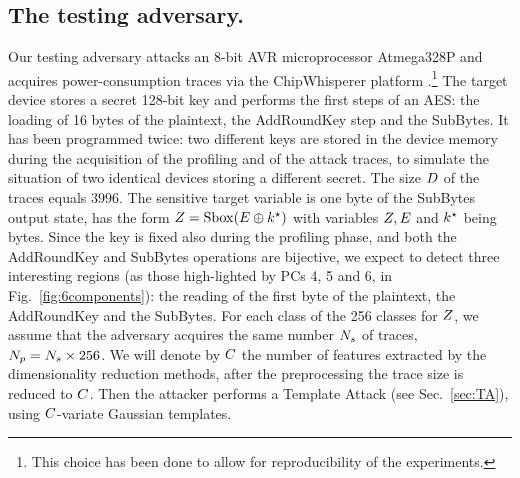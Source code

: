 \subsection{The testing adversary.}  
Our testing adversary attacks an 8-bit AVR microprocessor Atmega328P and acquires power-consumption traces via the ChipWhisperer platform \cite{o2014chipwhisperer}.\footnote{This choice has been done to allow for reproducibility of the experiments.} The target device stores a secret 128-bit key and performs the first steps of an AES: the loading of 16 bytes of the plaintext, the AddRoundKey step and the SubBytes. It has been programmed twice: two different keys are stored in the device memory during the acquisition of the profiling and of the attack traces, to simulate the situation of two identical devices storing a different secret. The size $D$ of the traces equals $3996$. The sensitive target  variable is one byte of the SubBytes output state, \ie has the form $Z = \mathrm{Sbox}(E \oplus k^\star)$ with variables $Z, E$ and $k^\star$ being bytes. Since the key is fixed also during the profiling phase, and both the AddRoundKey and SubBytes operations are bijective, we expect to detect three interesting regions (as those high-lighted by PCs 4, 5 and 6, in Fig.~\ref{fig:6components}): the reading of the first byte of the plaintext, the AddRoundKey and the SubBytes. For each class of the 256 classes for $Z$, we assume that the adversary acquires the same number $N_{s}$ of traces, \ie $N_p =N_{s}\times 256$. We will denote by $C$ the number of features extracted by the dimensionality reduction methods, \ie after the preprocessing the trace size is reduced to $C$. Then the attacker performs a Template Attack (see Sec.~\ref{sec:TA}), using $C$-variate Gaussian templates.


